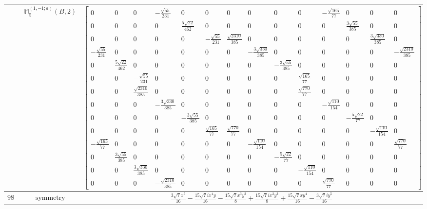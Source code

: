 \documentclass[fleqn,8pt,landscape]{jsarticle}
\begin{document}
\begin{longtable}{ccc}
$  $ & $ \mathbb{M}_{5}^{(1,-1;a)}(B,2) $ & $ \begin{bmatrix} 0 & 0 & 0 & - \frac{\sqrt{55}}{231} & 0 & 0 & 0 & 0 & 0 & 0 & - \frac{\sqrt{165}}{77} & 0 & 0 & 0 \\ 0 & 0 & 0 & 0 & \frac{5 \sqrt{22}}{462} & 0 & 0 & 0 & 0 & 0 & 0 & \frac{3 \sqrt{55}}{385} & 0 & 0 \\ 0 & 0 & 0 & 0 & 0 & - \frac{\sqrt{55}}{231} & \frac{\sqrt{2310}}{385} & 0 & 0 & 0 & 0 & 0 & \frac{3 \sqrt{330}}{385} & 0 \\ - \frac{\sqrt{55}}{231} & 0 & 0 & 0 & 0 & 0 & 0 & - \frac{3 \sqrt{330}}{385} & 0 & 0 & 0 & 0 & 0 & - \frac{\sqrt{2310}}{385} \\ 0 & \frac{5 \sqrt{22}}{462} & 0 & 0 & 0 & 0 & 0 & 0 & - \frac{3 \sqrt{55}}{385} & 0 & 0 & 0 & 0 & 0 \\ 0 & 0 & - \frac{\sqrt{55}}{231} & 0 & 0 & 0 & 0 & 0 & 0 & \frac{\sqrt{165}}{77} & 0 & 0 & 0 & 0 \\ 0 & 0 & \frac{\sqrt{2310}}{385} & 0 & 0 & 0 & 0 & 0 & 0 & \frac{\sqrt{770}}{77} & 0 & 0 & 0 & 0 \\ 0 & 0 & 0 & - \frac{3 \sqrt{330}}{385} & 0 & 0 & 0 & 0 & 0 & 0 & - \frac{\sqrt{110}}{154} & 0 & 0 & 0 \\ 0 & 0 & 0 & 0 & - \frac{3 \sqrt{55}}{385} & 0 & 0 & 0 & 0 & 0 & 0 & - \frac{5 \sqrt{22}}{77} & 0 & 0 \\ 0 & 0 & 0 & 0 & 0 & \frac{\sqrt{165}}{77} & \frac{\sqrt{770}}{77} & 0 & 0 & 0 & 0 & 0 & - \frac{\sqrt{110}}{154} & 0 \\ - \frac{\sqrt{165}}{77} & 0 & 0 & 0 & 0 & 0 & 0 & - \frac{\sqrt{110}}{154} & 0 & 0 & 0 & 0 & 0 & \frac{\sqrt{770}}{77} \\ 0 & \frac{3 \sqrt{55}}{385} & 0 & 0 & 0 & 0 & 0 & 0 & - \frac{5 \sqrt{22}}{77} & 0 & 0 & 0 & 0 & 0 \\ 0 & 0 & \frac{3 \sqrt{330}}{385} & 0 & 0 & 0 & 0 & 0 & 0 & - \frac{\sqrt{110}}{154} & 0 & 0 & 0 & 0 \\ 0 & 0 & 0 & - \frac{\sqrt{2310}}{385} & 0 & 0 & 0 & 0 & 0 & 0 & \frac{\sqrt{770}}{77} & 0 & 0 & 0 \end{bmatrix} $ \\ \hline
$ 981 $ & $ \text{symmetry} $ & $ \frac{3 \sqrt{7} x^{5}}{16} - \frac{15 \sqrt{7} i x^{4} y}{16} - \frac{15 \sqrt{7} x^{3} y^{2}}{8} + \frac{15 \sqrt{7} i x^{2} y^{3}}{8} + \frac{15 \sqrt{7} x y^{4}}{16} - \frac{3 \sqrt{7} i y^{5}}{16} $ \\

\end{longtable}
\end{document}
